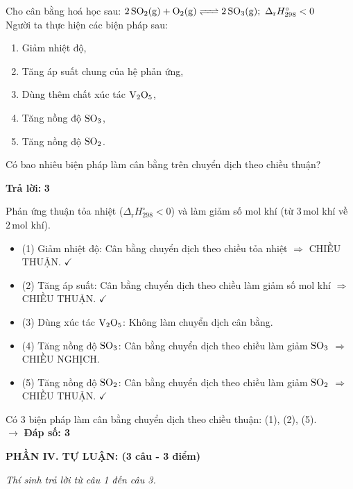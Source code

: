 \documentclass[11pt,a4paper]{article}
\begin{document}
\begin{ex}%
Cho cân bằng hoá học sau: $\ce{2SO2(g) + O2(g) <=> 2SO3(g)};\ \Delta_\text{r}H^\circ_{298} < 0$\\
Người ta thực hiện các biện pháp sau:
\begin{enumerate}[label=(\arabic*)]
\item Giảm nhiệt độ,
\item Tăng áp suất chung của hệ phản ứng,
\item Dùng thêm chất xúc tác $\ce{V2O5}$,
\item Tăng nồng độ $\ce{SO3}$,
\item Tăng nồng độ $\ce{SO2}$.
\end{enumerate}
Có bao nhiêu biện pháp làm cân bằng trên chuyển dịch theo chiều thuận?

\textbf{Trả lời: } \textbf{\color{hfRed}3}
\begin{loigiai}
Phản ứng thuận tỏa nhiệt ($\Delta_\text{r}H^\circ_{298} < 0$) và làm giảm số mol khí (từ $3\,\text{mol}$ khí về $2\,\text{mol}$ khí).
\begin{itemize}[leftmargin=0.8cm]
\item (1) Giảm nhiệt độ: Cân bằng chuyển dịch theo chiều tỏa nhiệt $\Rightarrow$ CHIỀU THUẬN. $\checkmark$
\item (2) Tăng áp suất: Cân bằng chuyển dịch theo chiều làm giảm số mol khí $\Rightarrow$ CHIỀU THUẬN. $\checkmark$
\item (3) Dùng xúc tác $\ce{V2O5}$: Không làm chuyển dịch cân bằng.
\item (4) Tăng nồng độ $\ce{SO3}$: Cân bằng chuyển dịch theo chiều làm giảm $\ce{SO3}$ $\Rightarrow$ CHIỀU NGHỊCH.
\item (5) Tăng nồng độ $\ce{SO2}$: Cân bằng chuyển dịch theo chiều làm giảm $\ce{SO2}$ $\Rightarrow$ CHIỀU THUẬN. $\checkmark$
\end{itemize}
Có 3 biện pháp làm cân bằng chuyển dịch theo chiều thuận: (1), (2), (5).\\
$\rightarrow$ \textbf{Đáp số: 3}
\end{loigiai}
\end{ex}

\vspace{6pt}
\noindent
\textbf{\large\color{mainGreen}PHẦN IV. TỰ LUẬN: (3 câu - 3 điểm)}

\textit{Thí sinh trả lời từ câu 1 đến câu 3.}
\vspace{4pt}
\end{document}
